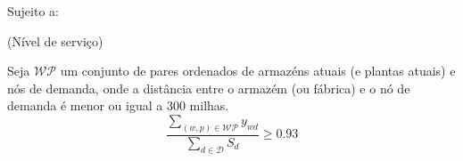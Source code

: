 \documentclass[12pt,a4paper]{article}
\begin{document}

Sujeito a: %

\begin{center}
    (Nível de serviço)

    Seja $\mathcal{WP}$ um conjunto de pares ordenados de armazéns atuais (e plantas atuais) e nós de demanda,
    onde a distância entre o armazém (ou fábrica) e o nó de demanda é menor ou igual a 300 milhas.
    \begin{equation}
        \frac{\sum_{(w, p) \in \mathcal{WP}} y_{wd}}{\sum_{d \in \mathcal{D}} S_d} \geq 0.93
    \end{equation}
\end{center}
\end{document}

